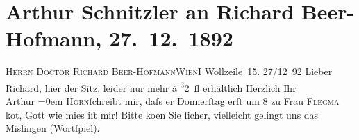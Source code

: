 

         
         \renewcommand{\erwaehntePersonen}{Personen: Richard Beer-Hofmann, Bertha Flegmann, Paul Horn}
         \renewcommand{\erwaehnteOrte}{Orte: Wien, Wollzeile}
         \renewcommand{\erwaehnteWerke}{}
               \section[Arthur Schnitzler an Richard Beer-Hofmann, 27. 12. 1892]{ Arthur Schnitzler an Richard Beer-Hofmann, 27. 12. 1892}\nopagebreak{}\rehead{ }\begin{ledgroupsized}[t]{13cm}\normalsize\beginnumbering \toendnotes[C]{\smallbreak\pagebreak[2]} 
\pstart{}{\pb}\textsc{Herrn Doctor Richard Beer-Hofmann}\pend{}\pstart{}\textsc{Wien}\pend{}\pstart{}I Wollzeile 15.\pend{}{\bigskip}\pstart
           \raggedleft{}{\pb}27/12 92\pend
           \pstart{}Lieber Richard,\pend\pstart
           hier der Sitz, leider nur mehr à \substVorne{}\textsuperscript{\textcolor{gray}{3}}\substDazwischen{}2\substHinten{} fl erhältlich\pend
           \pstart
           Herzlich Ihr{\\[\baselineskip]}\spacefill\mbox{Arthur}\pend
           \leftskip=0em{}\pstart
           \noindent{}\textsc{Horn}ſchreibt mir,
                     {\pb}daſs er Donnerſtag erſt um
                     8 zu Frau \textsc{Flegma{\geminationn}} ko{\geminationm}t, Gott wie mies iſt mir! Bitte ko{\geminationm}en Sie ſicher, vielleicht gelingt uns das Mislingen
                  (Wortſpiel).\pend
           
         
         \endnumbering{}\end{ledgroupsized}  \newcommand{\dateiname}{L00146}\newcommand{\titel}{Arthur Schnitzler an Richard Beer-Hofmann, 27. 12. 1892}\newcommand{\editorInnen}{Martin Anton Müller und Gerd-Hermann Susen}
      